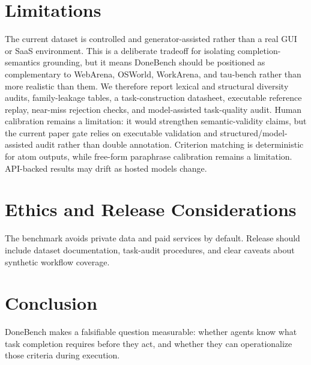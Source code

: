 \section{Limitations}
The current dataset is controlled and generator-assisted rather than a real GUI or SaaS environment. This is a deliberate tradeoff for isolating completion-semantics grounding, but it means DoneBench should be positioned as complementary to WebArena, OSWorld, WorkArena, and tau-bench rather than more realistic than them. We therefore report lexical and structural diversity audits, family-leakage tables, a task-construction datasheet, executable reference replay, near-miss rejection checks, and model-assisted task-quality audit. Human calibration remains a limitation: it would strengthen semantic-validity claims, but the current paper gate relies on executable validation and structured/model-assisted audit rather than double annotation. Criterion matching is deterministic for atom outputs, while free-form paraphrase calibration remains a limitation. API-backed results may drift as hosted models change.

\section{Ethics and Release Considerations}
The benchmark avoids private data and paid services by default. Release should include dataset documentation, task-audit procedures, and clear caveats about synthetic workflow coverage.

\section{Conclusion}
DoneBench makes a falsifiable question measurable: whether agents know what task completion requires before they act, and whether they can operationalize those criteria during execution.
